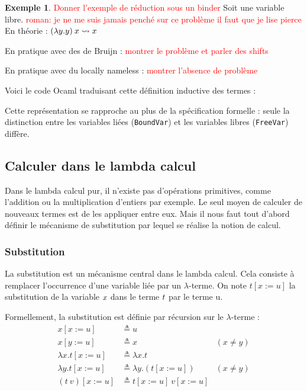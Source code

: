 \documentclass {article}
\newcommand{\codefrom}[3]
           {}
\theoremstyle{definition}
\newtheorem{example}{Exemple}
\theoremstyle{remark}
\newcommand{\todo}[1]{\textcolor{red}{#1}}
\begin{document}
\begin{example}
  \todo{Donner l'exemple de réduction sous un binder}
  Soit  une variable libre.
  \todo{roman: je ne me suis jamais penché sur ce problème il faut que je lise pierce}
  En théorie :
  \((\lambda y. y)\:x \leadsto x\)

  En pratique avec des de Bruijn : \todo{montrer le problème et parler des shifts}

  En pratique avec du locally nameless : \todo{montrer l'absence de problème}

\end{example}

Voici le code Ocaml traduisant cette définition inductive des termes :
%
\codefrom{untyped}{lambda}{untyped_term}

Cette représentation se rapproche au plus de la spécification formelle
: seule la distinction entre les variables liées (\lstinline!BoundVar!)
et les variables libres (\lstinline!FreeVar!) diffère.



  
\subsection{Calculer dans le lambda calcul}
\label{calculer_dans_le_lambda_calcul}

Dans le lambda calcul pur, il n'existe pas d'opérations primitives, comme l'addition ou la multiplication d'entiers par exemple. Le seul moyen de calculer de nouveaux termes est de les appliquer 
entre eux. Mais il nous faut tout d'abord définir le mécanisme de substitution par lequel se réalise la notion de calcul.

\subsubsection{Substitution}

\newcommand{\subst}[3]{#1[#2 := #3]}


La substitution est un mécanisme central dans le lambda calcul. Cela consiste 
à remplacer l'occurrence d'une variable liée par un \(\lambda\)-terme.
On note \(\subst{t}{x}{u}\) la substitution de la variable $x$ dans le terme $t$ par le 
terme u.

Formellement, la substitution est définie par récursion sur le $\lambda$-terme : 
\begin{align*}
    \subst{x}{x}{u} &\triangleq u \\
    \subst{x}{y}{u} &\triangleq x & (x \neq y)\\
    \subst{\lambda x.t}{x}{u} &\triangleq \lambda x.t \\
    \subst{\lambda y.t}{x}{u} &\triangleq \lambda y. (\subst{t}{x}{u}) & (x \neq y)\\
    \subst{(t\: v)}{x}{u} &\triangleq \subst{t}{x}{u}\: \subst{v}{x}{u}
\end{align*}
\end{document}
